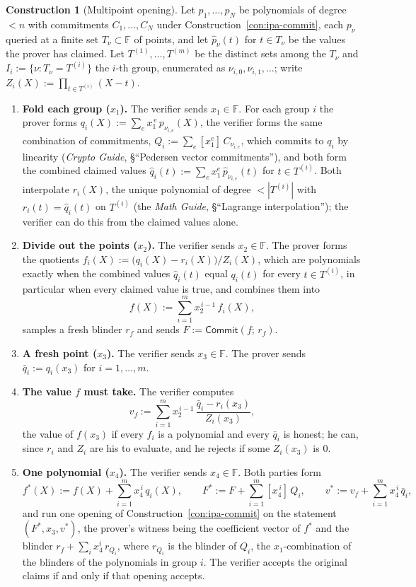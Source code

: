 \documentclass[11pt,a4paper]{article}
\theoremstyle{definition}
\newtheorem{construction}[theorem]{Construction}
\newcommand{\F}{\mathbb{F}}
\newcommand{\Comm}{\mathsf{Commit}}
\begin{document}
\begin{construction}[Multipoint opening]\label{con:halo2-multipoint}
Let $p_1, \dots, p_N$ be polynomials of degree $< n$ with commitments
$C_1, \dots, C_N$ under Construction~\ref{con:ipa-commit}, each $p_\nu$
queried at a finite set $T_\nu \subset \F$ of points, and let
$\hat p_\nu(t)$ for $t \in T_\nu$ be the values the prover has claimed.
Let $T^{(1)}, \dots, T^{(m)}$ be the distinct sets among the $T_\nu$ and
$I_i := \{\nu : T_\nu = T^{(i)}\}$ the $i$-th group, enumerated as
$\nu_{i,0}, \nu_{i,1}, \dots$; write
$Z_i(X) := \prod_{t \in T^{(i)}}(X - t)$.
\begin{enumerate}[leftmargin=*, itemsep=2pt]
\item \textbf{Fold each group ($x_1$).} The verifier sends $x_1 \in \F$.
  For each group $i$ the prover forms
  $q_i(X) := \sum_{e} x_1^{\,e}\,p_{\nu_{i,e}}(X)$, the verifier forms the
  same combination of commitments, $Q_i := \sum_e [x_1^{e}]\,C_{\nu_{i,e}}$,
  which commits to $q_i$ by linearity (\emph{Crypto Guide}, \S``Pedersen
  vector commitments''), and both form the combined claimed values
  $\hat q_i(t) := \sum_e x_1^{e}\,\hat p_{\nu_{i,e}}(t)$ for
  $t \in T^{(i)}$. Both interpolate $r_i(X)$, the unique polynomial of
  degree $< |T^{(i)}|$ with $r_i(t) = \hat q_i(t)$ on $T^{(i)}$ (the
  \emph{Math Guide}, \S``Lagrange interpolation''); the verifier can do
  this from the claimed values alone.
\item \textbf{Divide out the points ($x_2$).} The verifier sends
  $x_2 \in \F$. The prover forms the quotients
  $f_i(X) := \bigl(q_i(X) - r_i(X)\bigr)/Z_i(X)$, which are polynomials
  exactly when the combined values $\hat q_i(t)$ equal $q_i(t)$ for every
  $t \in T^{(i)}$, in particular when every claimed value is true, and
  combines them into
  \[
  f(X) := \sum_{i=1}^{m} x_2^{\,i-1}\,f_i(X),
  \]
  samples a fresh blinder $r_f$ and sends $F := \Comm(f;\, r_f)$.
\item \textbf{A fresh point ($x_3$).} The verifier sends $x_3 \in \F$. The
  prover sends $\bar q_i := q_i(x_3)$ for $i = 1, \dots, m$.
\item \textbf{The value $f$ must take.} The verifier computes
  \[
  v_f := \sum_{i=1}^{m} x_2^{\,i-1}\,\frac{\bar q_i - r_i(x_3)}{Z_i(x_3)},
  \]
  the value of $f(x_3)$ if every $f_i$ is a polynomial and every
  $\bar q_i$ is honest; he can, since $r_i$ and $Z_i$ are his to evaluate,
  and he rejects if some $Z_i(x_3)$ is $0$.
\item \textbf{One polynomial ($x_4$).} The verifier sends $x_4 \in \F$.
  Both parties form
  \[
  f^{*}(X) := f(X) + \sum_{i=1}^{m} x_4^{\,i}\,q_i(X),
  \qquad
  F^{*} := F + \sum_{i=1}^{m} [x_4^{\,i}]\,Q_i,
  \qquad
  v^{*} := v_f + \sum_{i=1}^{m} x_4^{\,i}\,\bar q_i,
  \]
  and run one opening of Construction~\ref{con:ipa-commit} on the
  statement $(F^{*}, x_3, v^{*})$, the prover's witness being the
  coefficient vector of $f^{*}$ and the blinder $r_f + \sum_i x_4^{i}\,
  r_{Q_i}$, where $r_{Q_i}$ is the blinder of $Q_i$, the $x_1$-combination
  of the blinders of the polynomials in group $i$. The verifier accepts
  the original claims if and only if that opening accepts.
\end{enumerate}
\end{construction}
\end{document}
